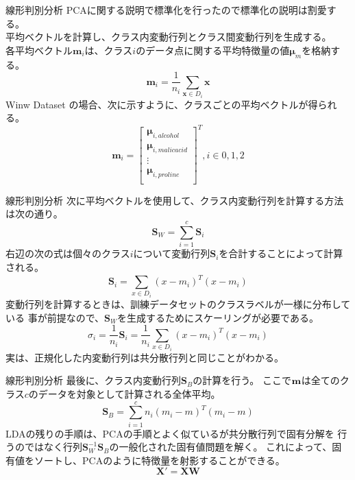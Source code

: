 \documentclass[aspectratio=169, dvipdfmx, 11pt]{beamer} %
\begin{document}
\begin{frame}{線形判別分析}
    PCAに関する説明で標準化を行ったので標準化の説明は割愛する。\\
    平均ベクトルを計算し、クラス内変動行列とクラス間変動行列を生成する。\\
    各平均ベクトル\(\bm{m}_i\)は、クラス\(i\)のデータ点に関する平均特徴量の値\(\bm{\mu}_m\)を格納する。
    \begin{equation*}
        \bm{m}_i = \frac{1}{n_i} \sum_{\bm{x} \in D_i}^{} \bm{x}
    \end{equation*}
    Winw Dataset の場合、次に示すように、クラスごとの平均ベクトルが得られる。
    \begin{equation*}
        \bm{m}_i = {
            \begin{bmatrix}
                \bm{\mu}_{i, alcohol} \\
                \bm{\mu}_{i, malic acid} \\
                \vdots \\
                \bm{\mu}_{i, proline} \\
            \end{bmatrix}
        }^T, i \in {0, 1, 2}
    \end{equation*}
\end{frame}

\begin{frame}{線形判別分析}
    次に平均ベクトルを使用して、クラス内変動行列を計算する方法は次の通り。
    \begin{equation*}
        \bm{S}_W = \sum_{i=1}^{c} \bm{S}_i
    \end{equation*}
    右辺の次の式は個々のクラス\(i\)について変動行列\(\bm{S}_i\)を合計することによって計算される。
    \begin{equation*}
        \bm{S}_i = \sum_{x \in D_i}^{} (x - m_i)^T (x - m_i)
    \end{equation*}
    変動行列を計算するときは、訓練データセットのクラスラベルが一様に分布している
    事が前提なので、\(\bm{S}_W\)を生成するためにスケーリングが必要である。
    \begin{equation*}
        \sigma_i = \frac{1}{n_i} \bm{S}_i
        = \frac{1}{n_i} \sum_{x \in D_i}^{} (x - m_i)^T (x - m_i)
    \end{equation*}
    実は、正規化した内変動行列は共分散行列と同じことがわかる。
\end{frame}

\begin{frame}{線形判別分析}
    最後に、クラス内変動行列\(\bm{S}_B\)の計算を行う。
    ここで\(\bf{m}\)は全てのクラス\(c\)のデータを対象として計算される全体平均。
    \begin{equation*}
        \bm{S}_B = \sum_{i=1}^{c} n_i (m_i - m)^T (m_i - m)
    \end{equation*}
    LDAの残りの手順は、PCAの手順とよく似ているが共分散行列で固有分解を
    行うのではなく行列\(\bm{S}_{W}^{-1} \bm{S}_B\)の一般化された固有値問題を解く。
    これによって、固有値をソートし、PCAのように特徴量を射影することができる。
    \begin{equation*}
        \bm{X'} = \bm{XW}
    \end{equation*}
\end{frame}
\end{document}
